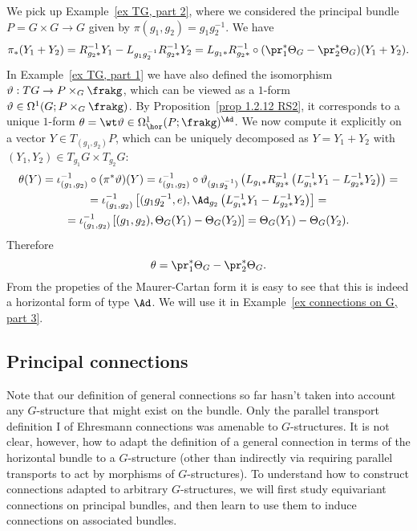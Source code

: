 \begin{example}\label{ex TG, part 3}
    We pick up Example~\ref{ex TG, part 2}, where we considered the principal bundle $P=G\times G\to G$ given by $\pi(g_1,g_2)=g_1g_2^{-1}$. We have 
    \[\pi_\ast(Y_1+Y_2)=R_{g_2\ast}^{-1}Y_1-L_{g_1g_2^{-1}}R_{g_2\ast}^{-1}Y_2=L_{g_1\ast}R_{g_2\ast}^{-1}\circ(\pr_1^\ast\Theta_G-\pr_2^\ast\Theta_G)(Y_1+Y_2).\]
    In Example~\ref{ex TG, part 1} we have also defined the isomorphism $\vartheta:TG\to P\times_G \frakg$, which can be viewed as a $1$-form $\vartheta\in\Omega^1(G;P\times_G \frakg)$. By Proposition~\ref{prop 1.2.12 RS2}, it corresponds to a unique $1$-form $\theta=\wt\vartheta\in\Omega^1_{\hor}(P;\frakg)^{\Ad}$. We now compute it explicitly on a vector $Y\in T_{(g_1,g_2)}P$, which can be uniquely decomposed as $Y=Y_1+Y_2$ with $(Y_1,Y_2)\in T_{g_1}G\times T_{g_2}G$:
    \begin{multline}
        \theta(Y)=\iota_{(g_1,g_2)}^{-1}\circ (\pi^\ast\vartheta)(Y)=\iota_{(g_1,g_2)}^{-1}\circ\vartheta_{(g_1g_2^{-1})}\left(L_{g_1\ast}R_{g_2\ast}^{-1}\left(L_{g_1\ast}^{-1}Y_1-L_{g_2\ast}^{-1}Y_2\right)\right)=\\
        =\iota_{(g_1,g_2)}^{-1}\left[(g_1g_2^{-1},e),\Ad_{g_2}\left(L_{g_1\ast}^{-1}Y_1-L_{g_2\ast}^{-1}Y_2\right)\right]=\\
        =\iota_{(g_1,g_2)}^{-1}\left[(g_1,g_2),\Theta_G(Y_1)-\Theta_G(Y_2)\right]=\Theta_G(Y_1)-\Theta_G(Y_2).
    \end{multline}
    Therefore 
    \[\theta=\pr_1^\ast \Theta_G-\pr_2^\ast\Theta_G.\]
    From the propeties of the Maurer-Cartan form it is easy to see that this is indeed a horizontal form of type $\Ad$. We will use it in Example~\ref{ex connections on G, part 3}.
\end{example}








\subsection{Principal connections}\label{sec principal connections}

Note that our definition of general connections so far hasn't taken into account any $G$-structure that might exist on the bundle. Only the parallel transport definition I of Ehresmann connections was amenable to $G$-structures. It is not clear, however, how to adapt the definition of a general connection in terms of the horizontal bundle to a $G$-structure (other than indirectly via requiring parallel transports to act by morphisms of $G$-structures). To understand how to construct connections adapted to arbitrary $G$-structures, we will first study equivariant connections on principal bundles, and then learn to use them to induce connections on associated bundles.

